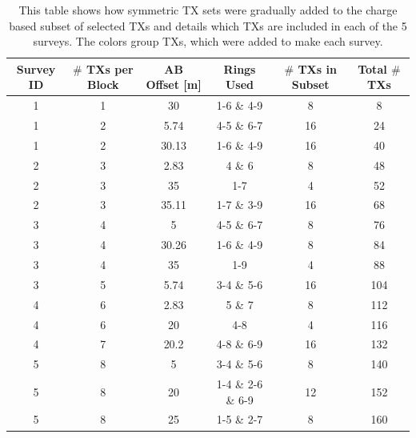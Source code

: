 \documentclass[preprint,authoryear,12pt]{elsarticle}
\begin{document}
\begin{table} [htp]
   \footnotesize
   \begin{center}
   \scriptsize
      \begin{tabular}{| c | c | c | c | c | c |}
         \hline
         \textbf{Survey ID} & \textbf{\mbox{\boldmath$\#$} TXs per Block} & \textbf{AB Offset [m]} & \textbf{Rings Used} & \textbf{\mbox{\boldmath$\#$} TXs in Subset} & \textbf{Total \mbox{\boldmath$\#$} TXs} \\
         \hline
         \rowcolor{Green}
         1 & 1 & 30 & 1-6 \& 4-9 & 8 & 8 \\
         \hline
         \rowcolor{Green}
         1 & 2 & 5.74 & 4-5 \& 6-7 & 16 & 24 \\
         \hline
         \rowcolor{Green}
         1 & 2 & 30.13 & 1-6 \& 4-9 & 16 & 40 \\
         \hline
         \rowcolor{Blue}
         2 & 3 & 2.83 & 4 \& 6 & 8 & 48 \\
         \hline
         \rowcolor{Blue}
         2 & 3 & 35 & 1-7 & 4 & 52 \\
         \hline
         \rowcolor{Blue}
         2 & 3 & 35.11 & 1-7 \& 3-9 & 16 & 68 \\
         \hline
         \rowcolor{Red}
         3 & 4 & 5 & 4-5 \& 6-7 & 8 & 76 \\
         \hline
         \rowcolor{Red}
         3 & 4 & 30.26 & 1-6 \& 4-9 & 8 & 84 \\
         \hline
         \rowcolor{Red}
         3 & 4 & 35 & 1-9 & 4 & 88 \\
         \hline
         \rowcolor{Red}
         3 & 5 & 5.74 & 3-4 \& 5-6 & 16 & 104 \\
         \hline
         \rowcolor{Yellow}
         4 & 6 & 2.83 & 5 \& 7 & 8 & 112 \\
         \hline
         \rowcolor{Yellow}
         4 & 6 & 20 & 4-8 & 4 & 116 \\
         \hline
         \rowcolor{Yellow}
         4 & 7 & 20.2 & 4-8 \& 6-9 & 16 & 132 \\
         \hline
         \rowcolor{Gray}
         5 & 8 & 5 & 3-4 \& 5-6 & 8 & 140 \\
         \hline
         \rowcolor{Gray}
         5 & 8 & 20 & 1-4 \& 2-6 \& 6-9 & 12 & 152 \\
         \hline
         \rowcolor{Gray}
         5 & 8 & 25 & 1-5 \& 2-7 & 8 & 160 \\
         \hline
      \end{tabular}
   \end{center}
\caption{This table shows how symmetric TX sets were gradually added to the charge based subset of selected TXs and details which TXs are included in each of the 5 surveys. The colors group TXs, which were added to make each survey.}
\label{table:SurveyDesign_Charge_SelectedTXs}
\end{table}
\end{document}

